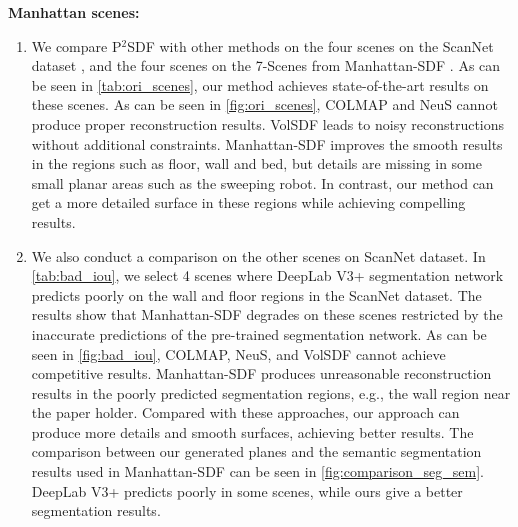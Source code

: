 \documentclass[10pt,journal,compsoc]{IEEEtran}
\begin{document}
\noindent\textbf{Manhattan scenes:} 
\begin{enumerate}[wide, labelwidth=!, labelindent=0pt]
	\item We compare P$^2$SDF with other methods on the four scenes on the ScanNet dataset \cite{dai2017scannet}, and the four scenes on the 7-Scenes \cite{shotton2013scene} from Manhattan-SDF \cite{guo2022neural}. As can be seen in \cref{tab:ori_scenes}, our method achieves state-of-the-art results on these scenes. As can be seen in \cref{fig:ori_scenes}, COLMAP and NeuS cannot produce proper reconstruction results. VolSDF leads to noisy reconstructions without additional constraints. Manhattan-SDF improves the smooth results in the regions such as floor, wall and bed, but details are missing in some small planar areas such as the sweeping robot. In contrast, our method can get a more detailed surface in these regions while achieving compelling results.
	\item We also conduct a comparison on the other scenes on ScanNet dataset. In \cref{tab:bad_iou}, we select 4 scenes where DeepLab V3+ \cite{chen2018encoder} segmentation network predicts poorly on the wall and floor regions in the ScanNet dataset. The results show that Manhattan-SDF \cite{guo2022neural} degrades on these scenes restricted by the inaccurate predictions of the pre-trained segmentation network. As can be seen in \cref{fig:bad_iou}, COLMAP, NeuS, and VolSDF cannot achieve competitive results. Manhattan-SDF produces unreasonable reconstruction results in the poorly predicted segmentation regions, e.g., the wall region near the paper holder. Compared with these approaches, our approach can produce more details and smooth surfaces, achieving better results. The comparison between our generated planes and the semantic segmentation results used in Manhattan-SDF can be seen in \cref{fig:comparison_seg_sem}. DeepLab V3+ predicts poorly in some scenes, while ours give a better segmentation results.
	

\end{enumerate}
\end{document}
